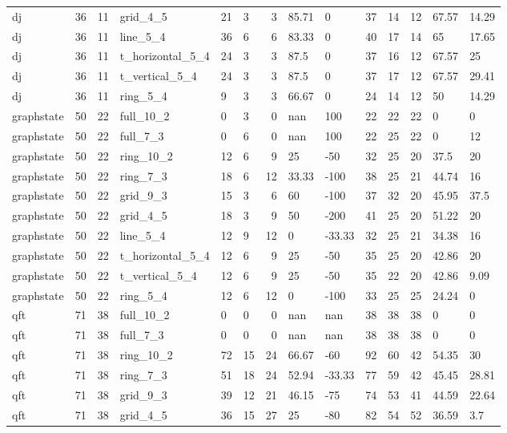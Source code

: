 \begin{longtable}{lrrlllrllllrll}
dj & 36 & 11 & grid\_4\_5 & 21 & 3 & 3 & 85.71 & 0 & 37 & 14 & 12 & 67.57 & 14.29 \\
dj & 36 & 11 & line\_5\_4 & 36 & 6 & 6 & 83.33 & 0 & 40 & 17 & 14 & 65 & 17.65 \\
dj & 36 & 11 & t\_horizontal\_5\_4 & 24 & 3 & 3 & 87.5 & 0 & 37 & 16 & 12 & 67.57 & 25 \\
dj & 36 & 11 & t\_vertical\_5\_4 & 24 & 3 & 3 & 87.5 & 0 & 37 & 17 & 12 & 67.57 & 29.41 \\
dj & 36 & 11 & ring\_5\_4 & 9 & 3 & 3 & 66.67 & 0 & 24 & 14 & 12 & 50 & 14.29 \\
graphstate & 50 & 22 & full\_10\_2 & 0 & 3 & 0 & nan & 100 & 22 & 22 & 22 & 0 & 0 \\
graphstate & 50 & 22 & full\_7\_3 & 0 & 6 & 0 & nan & 100 & 22 & 25 & 22 & 0 & 12 \\
graphstate & 50 & 22 & ring\_10\_2 & 12 & 6 & 9 & 25 & -50 & 32 & 25 & 20 & 37.5 & 20 \\
graphstate & 50 & 22 & ring\_7\_3 & 18 & 6 & 12 & 33.33 & -100 & 38 & 25 & 21 & 44.74 & 16 \\
graphstate & 50 & 22 & grid\_9\_3 & 15 & 3 & 6 & 60 & -100 & 37 & 32 & 20 & 45.95 & 37.5 \\
graphstate & 50 & 22 & grid\_4\_5 & 18 & 3 & 9 & 50 & -200 & 41 & 25 & 20 & 51.22 & 20 \\
graphstate & 50 & 22 & line\_5\_4 & 12 & 9 & 12 & 0 & -33.33 & 32 & 25 & 21 & 34.38 & 16 \\
graphstate & 50 & 22 & t\_horizontal\_5\_4 & 12 & 6 & 9 & 25 & -50 & 35 & 25 & 20 & 42.86 & 20 \\
graphstate & 50 & 22 & t\_vertical\_5\_4 & 12 & 6 & 9 & 25 & -50 & 35 & 22 & 20 & 42.86 & 9.09 \\
graphstate & 50 & 22 & ring\_5\_4 & 12 & 6 & 12 & 0 & -100 & 33 & 25 & 25 & 24.24 & 0 \\
qft & 71 & 38 & full\_10\_2 & 0 & 0 & 0 & nan & nan & 38 & 38 & 38 & 0 & 0 \\
qft & 71 & 38 & full\_7\_3 & 0 & 0 & 0 & nan & nan & 38 & 38 & 38 & 0 & 0 \\
qft & 71 & 38 & ring\_10\_2 & 72 & 15 & 24 & 66.67 & -60 & 92 & 60 & 42 & 54.35 & 30 \\
qft & 71 & 38 & ring\_7\_3 & 51 & 18 & 24 & 52.94 & -33.33 & 77 & 59 & 42 & 45.45 & 28.81 \\
qft & 71 & 38 & grid\_9\_3 & 39 & 12 & 21 & 46.15 & -75 & 74 & 53 & 41 & 44.59 & 22.64 \\
qft & 71 & 38 & grid\_4\_5 & 36 & 15 & 27 & 25 & -80 & 82 & 54 & 52 & 36.59 & 3.7 \\

\end{longtable}
